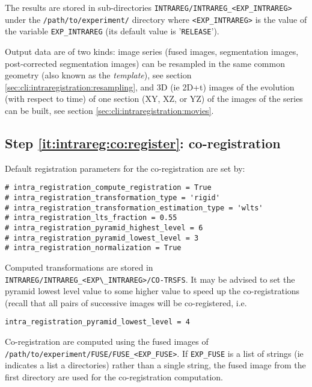 The results are stored in sub-directories
\texttt{INTRAREG/INTRAREG\_<EXP\_INTRAREG>} under the
\texttt{/path/to/experiment/} directory where \texttt{<EXP\_INTRAREG>} is the value of the variable \texttt{EXP\_INTRAREG} (its
default value is '\texttt{RELEASE}'). 

\mbox{}
\mbox{}

Output data are of two kinds: image series (fused images, segmentation
images, post-corrected segmentation images) can be resampled in the
same common geometry (also known as the \textit{template}), see
section \ref{sec:cli:intraregistration:resampling}, and 3D (ie 2D+t)
images of the evolution (with respect to time) of one section (XY, XZ,
or YZ) of the images of the series can be built, see
section \ref{sec:cli:intraregistration:movies}.





\subsection{Step \ref{it:intrareg:co:register}: co-registration}
\label{sec:cli:intraregistration:coregistration}
Default registration parameters for the co-registration are set by:
\begin{verbatim}
# intra_registration_compute_registration = True
# intra_registration_transformation_type = 'rigid'
# intra_registration_transformation_estimation_type = 'wlts'
# intra_registration_lts_fraction = 0.55
# intra_registration_pyramid_highest_level = 6
# intra_registration_pyramid_lowest_level = 3
# intra_registration_normalization = True
\end{verbatim}
Computed transformations are stored in \verb|INTRAREG/INTRAREG_<EXP\_INTRAREG>/CO-TRSFS|.
It may be advised to set the pyramid lowest level value to some higher value to speed up the co-registrations (recall that all pairs of successive images will be co-registered, i.e.
\begin{verbatim}
intra_registration_pyramid_lowest_level = 4
\end{verbatim}

Co-registration are computed using the fused images of
\texttt{/path/to/experiment/FUSE/FUSE\_<EXP\_FUSE>}. If
\texttt{EXP\_FUSE} is a list of strings (ie indicates a list a
directories) rather than a single string, the fused image from the
first directory are used for the co-registration computation.

